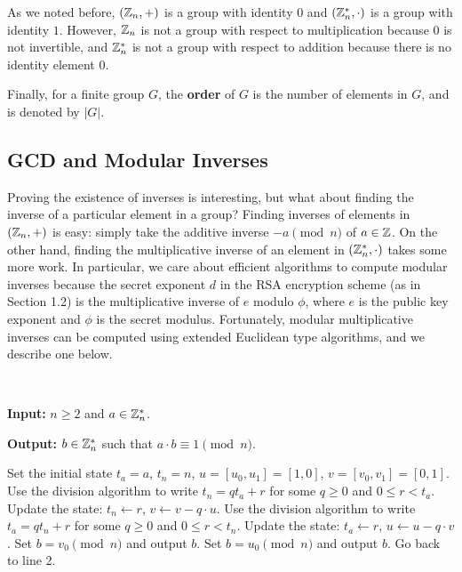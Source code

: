 As we noted before, $(\mathbb{Z}_n, +)$ is a group with identity $0$ and $(\mathbb{Z}_n^*, \cdot)$ is a group 
with identity $1$. However, $\mathbb{Z}_n$ is not a group with respect to multiplication 
because $0$ is not invertible, and 
$\mathbb{Z}_n^*$ is not a group with respect to addition because there is no identity element $0$. 

Finally, for a finite group $G$, the {\bf order} of $G$ is the number of elements in 
$G$, and is denoted by $|G|$. 

\subsection{GCD and Modular Inverses}
Proving the existence of inverses is interesting, but what about finding the inverse of a particular
element in a group? Finding inverses of elements in $(\mathbb{Z}_n, +)$ is easy: simply take the 
additive inverse $-a \pmod n$ of $a \in \mathbb{Z}$. On the other hand, finding the multiplicative 
inverse of an element in $(\mathbb{Z}_n^*, \cdot)$ takes some more work. In particular, we care about 
efficient algorithms to compute modular inverses because the secret exponent $d$ in the RSA 
encryption scheme (as in Section 1.2) is the multiplicative inverse of $e$ modulo $\phi$, where 
$e$ is the public key exponent and $\phi$ is the secret modulus. Fortunately, modular multiplicative
inverses can be computed using extended Euclidean type algorithms, and we describe one below. 

\begin{algo}~

{\bf Input:} $n \geq 2$ and $a \in \mathbb{Z}_n^*$.

{\bf Output:} $b \in \mathbb{Z}_n^*$ such that $a \cdot b \equiv 1 \pmod n$. \vspace{0.5em}

\begin{algorithmic}[1]
\State Set the initial state $t_a = a$, $t_n = n$, $u = [u_0, u_1] = [1, 0]$, $v = [v_0, v_1] = [0, 1]$. 
    \State Use the division algorithm to write $t_n = qt_a + r$ for some $q \geq 0$ and $0 \leq r < t_a$.
    \State Update the state: $t_n \gets r$, $v \gets v - q \cdot u$. 
    \State Use the division algorithm to write $t_a = qt_n + r$ for some $q \geq 0$ and $0 \leq r < t_n$.
    \State Update the state: $t_a \gets r$, $u \gets u - q \cdot v$. 
\EndIf 
{}
    \State Set $b = v_0 \pmod n$ and output $b$.
    \State Set $b = u_0 \pmod n$ and output $b$.
\Else
    \State Go back to line 2.
\EndIf
\end{algorithmic}
\end{algo}

